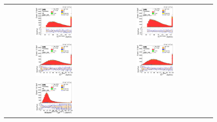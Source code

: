 \begin{figure}[ht]
  \begin{center}
    \begin{tabular}{ccc}
      \includegraphics[width=0.4\textwidth]{figures/tW/fig/FCNC_MVA_input/ee/H_BSM_xj1b_l1_pt.png}&
      \includegraphics[width=0.4\textwidth]{figures/tW/fig/FCNC_MVA_input/mumu/H_BSM_xj1b_l1_pt.png}\\
      \includegraphics[width=0.4\textwidth]{figures/tW/fig/FCNC_MVA_input/ee/H_BSM_xj1b_ll_j1_pt.png}&
      \includegraphics[width=0.4\textwidth]{figures/tW/fig/FCNC_MVA_input/mumu/H_BSM_xj1b_ll_j1_pt.png}\\
      \includegraphics[width=0.4\textwidth]{figures/tW/fig/FCNC_MVA_input/ee/H_BSM_xj1b_M_l2_j1.png}&

\end{tabular}
\end{center}
\end{figure}
